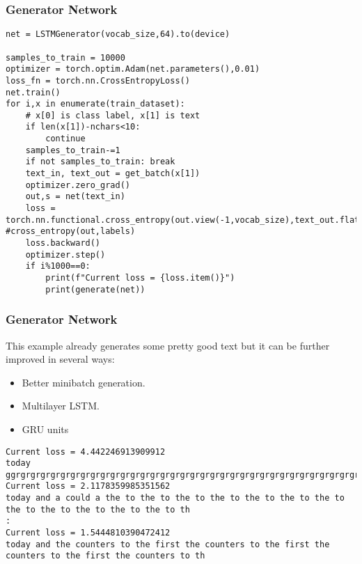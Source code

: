 \begin{frame}[fragile] \frametitle{Generator Network}
\begin{lstlisting}
net = LSTMGenerator(vocab_size,64).to(device)

samples_to_train = 10000
optimizer = torch.optim.Adam(net.parameters(),0.01)
loss_fn = torch.nn.CrossEntropyLoss()
net.train()
for i,x in enumerate(train_dataset):
    # x[0] is class label, x[1] is text
    if len(x[1])-nchars<10:
        continue
    samples_to_train-=1
    if not samples_to_train: break
    text_in, text_out = get_batch(x[1])
    optimizer.zero_grad()
    out,s = net(text_in)
    loss = torch.nn.functional.cross_entropy(out.view(-1,vocab_size),text_out.flatten()) #cross_entropy(out,labels)
    loss.backward()
    optimizer.step()
    if i%1000==0:
        print(f"Current loss = {loss.item()}")
        print(generate(net))
\end{lstlisting}

\end{frame}

\begin{frame}[fragile] \frametitle{Generator Network}

This example already generates some pretty good text but it can be further improved in several ways:

\begin{itemize}
\item Better minibatch generation.
\item Multilayer LSTM.
\item GRU units
\end{itemize}


\begin{lstlisting}
Current loss = 4.442246913909912
today ggrgrgrgrgrgrgrgrgrgrgrgrgrgrgrgrgrgrgrgrgrgrgrgrgrgrgrgrgrgrgrgrgrgrgrgrgrgrgrgrgrgrgrgrgrgrgrgrgrg
Current loss = 2.1178359985351562
today and a could a the to the to the to the to the to the to the to the to the to the to the to the to th
:
Current loss = 1.5444810390472412
today and the counters to the first the counters to the first the counters to the first the counters to th
\end{lstlisting}


\end{frame}

